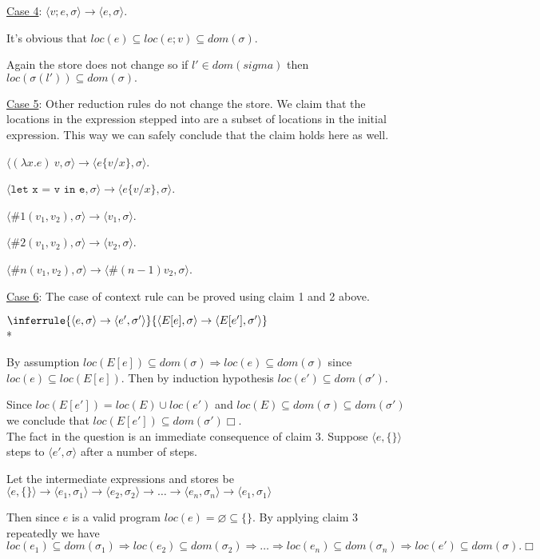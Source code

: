 \documentclass[10pt]{article}
\newcommand{\Rule}[3]{
    \label{rule:#1}
  \hfill
  \ensuremath{\inferrule{#2}{#3}}
  \hfill
}
\begin{document}
\begin{enumerate} [(a)]
    \underline{Case 4}: $\langle v;e, \sigma \rangle \rightarrow \langle e, \sigma \rangle$.

    It's obvious that $loc(e) \subseteq loc(e;v) \subseteq dom(\sigma)$.

    Again the store does not change so if $l' \in dom(sigma)$ then $loc(\sigma(l')) \subseteq dom(\sigma).$

    \underline{Case 5}: Other reduction rules do not change the store. We claim that the locations in the expression stepped into are a subset of locations in the initial expression. This way we can safely conclude that the claim holds here as well.

    $\langle (\lambda x.e)~v, \sigma \rangle \rightarrow \langle e\{v/x\}, \sigma \rangle$.

    $\langle \texttt{let x = v in e}, \sigma \rangle \rightarrow \langle e\{v/x\}, \sigma \rangle$.

    $\langle \#1(v_1, v_2), \sigma \rangle \rightarrow \langle v_1, \sigma \rangle$.

    $\langle \#2(v_1, v_2), \sigma \rangle \rightarrow \langle v_2, \sigma \rangle$.

    $\langle \#n(v_1, v_2), \sigma \rangle \rightarrow \langle \#(n-1)v_2, \sigma \rangle$.

    \underline{Case 6}: The case of context rule can be proved using claim 1 and 2 above.

    \Rule{}{
    \langle e, \sigma \rangle \rightarrow \langle e', \sigma' \rangle
  }{
    \langle E[e], \sigma \rangle \rightarrow \langle E[e'], \sigma' \rangle
  } \\*

    By assumption $loc(E[e]) \subseteq dom(\sigma) \Rightarrow loc(e) \subseteq dom(\sigma)$ since $loc(e) \subseteq loc (E[e])$. Then by induction hypothesis $loc(e') \subseteq dom(\sigma')$.

    Since $loc(E[e']) = loc(E) \cup loc(e')$ and $loc(E) \subseteq dom(\sigma) \subseteq dom(\sigma')$ we conclude that $loc(E[e']) \subseteq dom(\sigma')\Box$.\\

    The fact in the question is an immediate consequence of claim 3. Suppose $\langle e, \{\} \rangle$ steps to $\langle e', \sigma \rangle$ after a number of steps.

    Let the intermediate expressions and stores be $\langle e, \{\} \rangle \rightarrow \langle e_1, \sigma_1 \rangle \rightarrow \langle e_2, \sigma_2 \rangle \rightarrow \ldots \rightarrow \langle e_n, \sigma_n \rangle \rightarrow \langle e_1, \sigma_1 \rangle$

    Then since $e$ is a valid program $loc(e) = \varnothing \subseteq \{\}$. By applying claim 3 repeatedly we have $loc(e_1) \subseteq dom(\sigma_1) \Rightarrow loc(e_2) \subseteq dom(\sigma_2) \Rightarrow \ldots \Rightarrow loc(e_n) \subseteq dom(\sigma_n) \Rightarrow loc(e') \subseteq dom(\sigma). \Box$
\end{enumerate}
\end{document}
